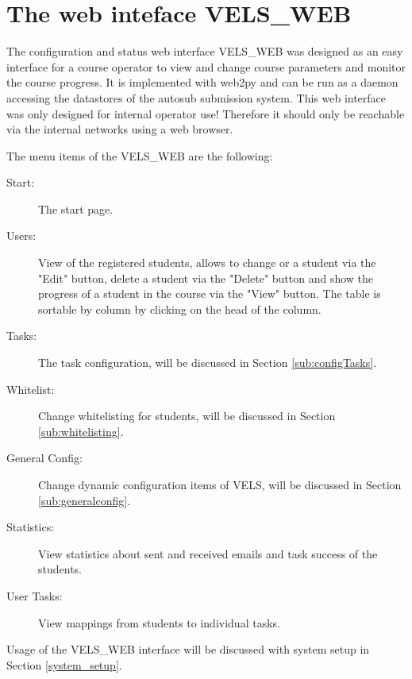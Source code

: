 \section{The web inteface VELS\_WEB} \label{VELS_WEB}

The configuration and status web interface VELS\_WEB was designed as an easy interface
for a course operator to view and change course parameters and monitor the course progress.
It is implemented with web2py and can be run as a daemon accessing the datastores of the
autosub submission system. This web interface was only 
designed for internal operator use! Therefore it should only be reachable via 
the internal networks using a web browser.

The menu items of the VELS\_WEB are the following:
\begin{description}
\item [Start:] The start page.
\item [Users:] View of the registered students, allows to change or a student via the
    "Edit" button, delete a student via the "Delete" button  and show the progress of
    a student in the course via the "View" button. The table is sortable by column by
    clicking on the head of the column.
\item [Tasks:] The task configuration, will be discussed in Section \ref{sub:configTasks}.
\item [Whitelist:] Change whitelisting for students, will be discussed in Section
    \ref{sub:whitelisting}.
\item [General Config:] Change dynamic configuration items of VELS, will be discussed in
    Section \ref{sub:generalconfig}.
\item [Statistics:] View statistics about sent and received emails and task success of
    the students.
\item [User Tasks:] View mappings from students to individual tasks.
\end{description}

Usage of the VELS\_WEB interface will be discussed with system setup in Section \ref{system_setup}.
